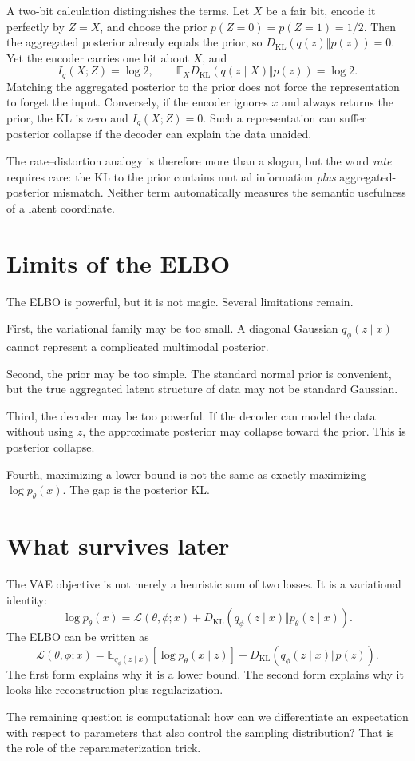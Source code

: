 A two-bit calculation distinguishes the terms. Let $X$ be a fair bit, encode it perfectly by $Z=X$, and choose the prior $p(Z=0)=p(Z=1)=1/2$. Then the aggregated posterior already equals the prior, so $D_{\mathrm{KL}}(q(z)\Vert p(z))=0$. Yet the encoder carries one bit about $X$, and
\[
 I_q(X;Z)=\log2,\qquad
 \mathbb E_XD_{\mathrm{KL}}(q(z\mid X)\Vert p(z))=\log2.
\]
Matching the aggregated posterior to the prior does not force the representation to forget the input. Conversely, if the encoder ignores $x$ and always returns the prior, the KL is zero and $I_q(X;Z)=0$. Such a representation can suffer posterior collapse if the decoder can explain the data unaided.

The rate--distortion analogy is therefore more than a slogan, but the word \emph{rate} requires care: the KL to the prior contains mutual information \emph{plus} aggregated-posterior mismatch. Neither term automatically measures the semantic usefulness of a latent coordinate.

\section{Limits of the ELBO}

The ELBO is powerful, but it is not magic.  Several limitations remain.

First, the variational family may be too small.  A diagonal Gaussian \(q_\phi(z\mid x)\) cannot represent a complicated multimodal posterior.

Second, the prior may be too simple.  The standard normal prior is convenient, but the true aggregated latent structure of data may not be standard Gaussian.

Third, the decoder may be too powerful.  If the decoder can model the data without using \(z\), the approximate posterior may collapse toward the prior.  This is posterior collapse.

Fourth, maximizing a lower bound is not the same as exactly maximizing \(\log p_\theta(x)\).  The gap is the posterior KL.

\section{What survives later}

The VAE objective is not merely a heuristic sum of two losses.  It is a variational identity:
\[
  \log p_\theta(x)
  =\mathcal L(\theta,\phi;x)
  +D_{\mathrm{KL}}(q_\phi(z\mid x)\Vert p_\theta(z\mid x)).
\]
The ELBO can be written as
\[
  \mathcal L(\theta,\phi;x)
  =\mathbb E_{q_\phi(z\mid x)}[\log p_\theta(x\mid z)]
  -D_{\mathrm{KL}}(q_\phi(z\mid x)\Vert p(z)).
\]
The first form explains why it is a lower bound.  The second form explains why it looks like reconstruction plus regularization.

The remaining question is computational: how can we differentiate an expectation with respect to parameters that also control the sampling distribution?  That is the role of the reparameterization trick.
